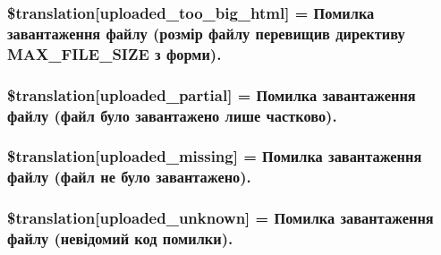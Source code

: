 \subsubsection[{\$translation}]{\setlength{\rightskip}{0pt plus 5cm}\$translation\mbox{[}\textquotesingle{}uploaded\+\_\+too\+\_\+big\+\_\+html\textquotesingle{}\mbox{]} = \textquotesingle{}Помилка завантаження файлу (розмір файлу перевищив директиву M\+A\+X\+\_\+\+F\+I\+L\+E\+\_\+\+S\+I\+Z\+E з форми).\textquotesingle{}}\label{class_8upload_8uk___u_a_8php_a623d5b8b92169f57d7e43458aa911cbb}
\hypertarget{class_8upload_8uk___u_a_8php_a967c17da21b0a2d3bd65cca3a9ca0ea8}{}
\subsubsection[{\$translation}]{\setlength{\rightskip}{0pt plus 5cm}\$translation\mbox{[}\textquotesingle{}uploaded\+\_\+partial\textquotesingle{}\mbox{]} = \textquotesingle{}Помилка завантаження файлу (файл було завантажено лише частково).\textquotesingle{}}\label{class_8upload_8uk___u_a_8php_a967c17da21b0a2d3bd65cca3a9ca0ea8}
\hypertarget{class_8upload_8uk___u_a_8php_a0cce433260be65f1f35853a6b4b8952b}{}
\subsubsection[{\$translation}]{\setlength{\rightskip}{0pt plus 5cm}\$translation\mbox{[}\textquotesingle{}uploaded\+\_\+missing\textquotesingle{}\mbox{]} = \textquotesingle{}Помилка завантаження файлу (файл не було завантажено).\textquotesingle{}}\label{class_8upload_8uk___u_a_8php_a0cce433260be65f1f35853a6b4b8952b}
\hypertarget{class_8upload_8uk___u_a_8php_a4a9168e922b827e6a28b5db1c00774ca}{}
\subsubsection[{\$translation}]{\setlength{\rightskip}{0pt plus 5cm}\$translation\mbox{[}\textquotesingle{}uploaded\+\_\+unknown\textquotesingle{}\mbox{]} = \textquotesingle{}Помилка завантаження файлу (невідомий код помилки).\textquotesingle{}}\label{class_8upload_8uk___u_a_8php_a4a9168e922b827e6a28b5db1c00774ca}
\hypertarget{class_8upload_8uk___u_a_8php_a3afc377bd803683314f413a814243066}{}
